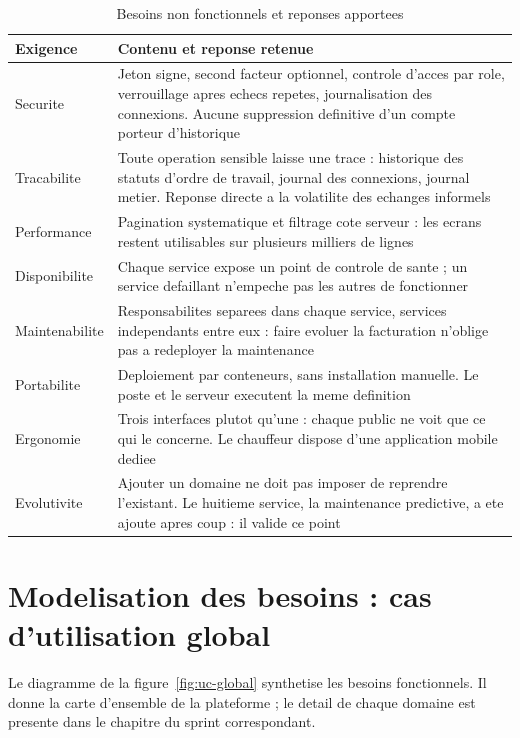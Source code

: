\begin{table}[H]
\centering
\caption{Besoins non fonctionnels et reponses apportees}
\label{tab:besoins-nf}
\small
\begin{tabularx}{\textwidth}{@{}p{2.6cm}X@{}}
\toprule
\textbf{Exigence} & \textbf{Contenu et reponse retenue} \\ \midrule
Securite & Jeton signe, second facteur optionnel, controle d'acces par
  role, verrouillage apres echecs repetes, journalisation des connexions.
  Aucune suppression definitive d'un compte porteur d'historique \\
Tracabilite & Toute operation sensible laisse une trace : historique des
  statuts d'ordre de travail, journal des connexions, journal metier.
  Reponse directe a la volatilite des echanges informels \\
Performance & Pagination systematique et filtrage cote serveur : les
  ecrans restent utilisables sur plusieurs milliers de lignes \\
Disponibilite & Chaque service expose un point de controle de sante ;
  un service defaillant n'empeche pas les autres de fonctionner \\
Maintenabilite & Responsabilites separees dans chaque service, services
  independants entre eux : faire evoluer la facturation n'oblige pas a
  redeployer la maintenance \\
Portabilite & Deploiement par conteneurs, sans installation manuelle. Le
  poste et le serveur executent la meme definition \\
Ergonomie & Trois interfaces plutot qu'une : chaque public ne voit que ce
  qui le concerne. Le chauffeur dispose d'une application mobile dediee \\
Evolutivite & Ajouter un domaine ne doit pas imposer de reprendre
  l'existant. Le huitieme service, la maintenance predictive, a ete
  ajoute apres coup : il valide ce point \\
\bottomrule
\end{tabularx}
\end{table}

\section{Modelisation des besoins : cas d'utilisation global}
\label{sec:uc-global}

Le diagramme de la figure~\ref{fig:uc-global} synthetise les besoins
fonctionnels. Il donne la carte d'ensemble de la plateforme ; le detail
de chaque domaine est presente dans le chapitre du sprint correspondant.

